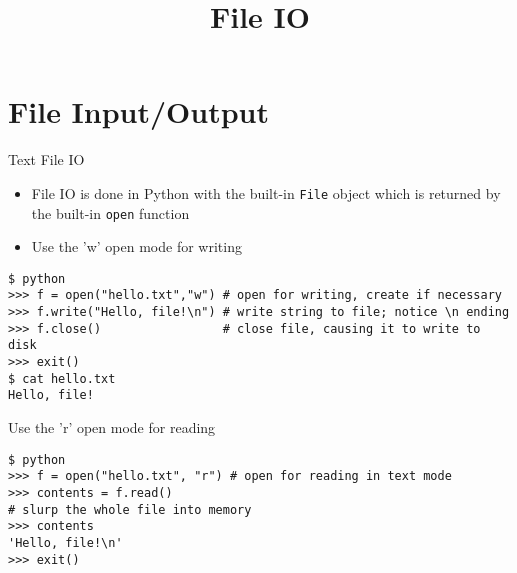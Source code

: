 \documentclass[smaller, aspectratio=1610]{beamer}
\date{}
\title{File IO}
\begin{document}
\maketitle

\section{File Input/Output}
\label{sec:org65c1c8d}

\begin{frame}[label={sec:org38f11b2},fragile]{Text File IO}
 \begin{itemize}
\item File IO is done in Python with the built-in \texttt{File} object which is returned by the built-in \texttt{open} function
\item Use the 'w' open mode for writing
\end{itemize}

\lstset{language=Python,label= ,caption= ,captionpos=b,numbers=none}
\begin{lstlisting}
$ python
>>> f = open("hello.txt","w") # open for writing, create if necessary
>>> f.write("Hello, file!\n") # write string to file; notice \n ending
>>> f.close()                 # close file, causing it to write to disk
>>> exit()
$ cat hello.txt
Hello, file!
\end{lstlisting}

Use the ’r’ open mode for reading

\lstset{language=Python,label= ,caption= ,captionpos=b,numbers=none}
\begin{lstlisting}
$ python
>>> f = open("hello.txt", "r") # open for reading in text mode
>>> contents = f.read()
# slurp the whole file into memory
>>> contents
'Hello, file!\n'
>>> exit()
\end{lstlisting}
\end{frame}
\end{document}
